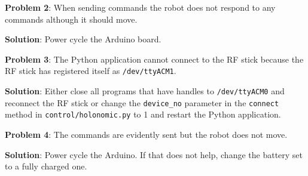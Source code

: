 \documentclass[a4paper,12pt]{article}
\begin{document}
\textbf{Problem 2}: When sending commands the robot does not respond to any commands although it should move.

\textbf{Solution}: Power cycle the Arduino board.

\textbf{Problem 3}: The Python application cannot connect to the RF stick because the RF stick has registered itself as \texttt{/dev/ttyACM1}.

\textbf{Solution}: Either close all programs that have handles to \texttt{/dev/ttyACM0} and reconnect the RF stick or change the \texttt{device\_no} parameter in the \texttt{connect} method in \texttt{control/holonomic.py} to 1 and restart the Python application.

\textbf{Problem 4}: The commands are evidently sent but the robot does not move.

\textbf{Solution}: Power cycle the Arduino. If that does not help, change the battery set to a fully charged one.
\end{document}
